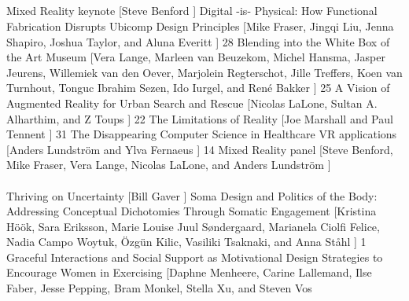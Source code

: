 \ifshowProgramme

\begin{sessions}
 \\
\end{sessions}

\begin{sessions}
 \\
 \\
 \\
    {Mixed Reality keynote%
}%
    [Steve Benford%
]%
    { 
}
    {Digital -is- Physical: How Functional Fabrication Disrupts Ubicomp Design Principles%
}%
    [Mike Fraser, Jingqi Liu, Jenna Shapiro, Joshua Taylor, and Aluna Everitt%
]%
    { 28
}
    {Blending into the White Box of the Art Museum%
}%
    [Vera Lange, Marleen van Beuzekom, Michel Hansma, Jasper Jeurens, Willemiek van den Oever, Marjolein Regterschot, Jille Treffers, Koen van Turnhout, Tonguc Ibrahim Sezen, Ido Iurgel, and René Bakker%
]%
    { 25
}
    {A Vision of Augmented Reality for Urban Search and Rescue%
}%
    [Nicolas LaLone, Sultan A. Alharthim, and Z Toups%
]%
    { 22
}
    {The Limitations of Reality%
}%
    [Joe Marshall and Paul Tennent%
]%
    { 31
}
    {The Disappearing Computer Science in Healthcare VR applications%
}%
    [Anders Lundström and Ylva Fernaeus%
]%
    { 14
}
    {Mixed Reality panel%
}%
    [Steve Benford, Mike Fraser, Vera Lange, Nicolas LaLone, and Anders Lundström%
]%
    { 
}
 \\
 \\
    {Thriving on Uncertainty%
}%
    [Bill Gaver%
]%
    { 
}
    {Soma Design and Politics of the Body: Addressing Conceptual Dichotomies Through Somatic Engagement%
}%
    [Kristina Höök, Sara Eriksson, Marie Louise Juul Søndergaard, Marianela Ciolfi Felice, Nadia Campo Woytuk, Özgün Kilic, Vasiliki Tsaknaki, and Anna Ståhl%
]%
    { 1
}
    {Graceful Interactions and Social Support as Motivational Design Strategies to Encourage Women in Exercising%
}%
    [Daphne Menheere, Carine Lallemand, Ilse Faber, Jesse Pepping, Bram Monkel, Stella Xu, and Steven Vos%

\end{sessions}
